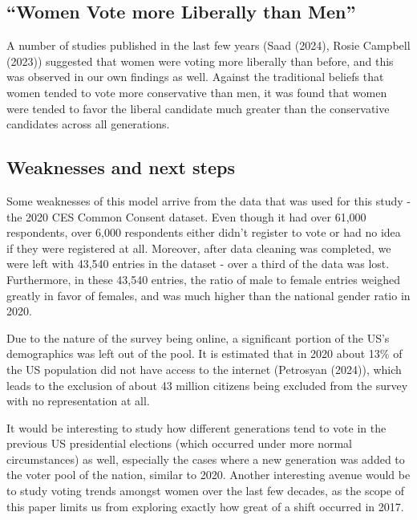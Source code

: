 \documentclass[
  letterpaper,
  DIV=11,
  numbers=noendperiod]{scrartcl}
\begin{document}
\hypertarget{women-vote-more-liberally-than-men}{%
\subsection{``Women Vote more Liberally than
Men''}\label{women-vote-more-liberally-than-men}}

A number of studies published in the last few years (Saad (2024), Rosie
Campbell (2023)) suggested that women were voting more liberally than
before, and this was observed in our own findings as well. Against the
traditional beliefs that women tended to vote more conservative than
men, it was found that women were tended to favor the liberal candidate
much greater than the conservative candidates across all generations.

\hypertarget{weaknesses-and-next-steps}{%
\subsection{Weaknesses and next steps}\label{weaknesses-and-next-steps}}

Some weaknesses of this model arrive from the data that was used for
this study - the 2020 CES Common Consent dataset. Even though it had
over 61,000 respondents, over 6,000 respondents either didn't register
to vote or had no idea if they were registered at all. Moreover, after
data cleaning was completed, we were left with 43,540 entries in the
dataset - over a third of the data was lost. Furthermore, in these
43,540 entries, the ratio of male to female entries weighed greatly in
favor of females, and was much higher than the national gender ratio in
2020.

Due to the nature of the survey being online, a significant portion of
the US's demographics was left out of the pool. It is estimated that in
2020 about 13\% of the US population did not have access to the internet
(Petrosyan (2024)), which leads to the exclusion of about 43 million
citizens being excluded from the survey with no representation at all.

It would be interesting to study how different generations tend to vote
in the previous US presidential elections (which occurred under more
normal circumstances) as well, especially the cases where a new
generation was added to the voter pool of the nation, similar to 2020.
Another interesting avenue would be to study voting trends amongst women
over the last few decades, as the scope of this paper limits us from
exploring exactly how great of a shift occurred in 2017.
\end{document}
